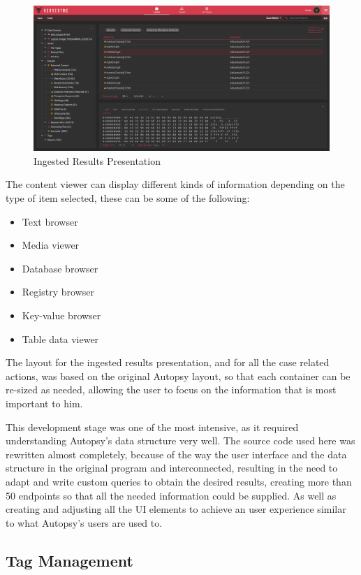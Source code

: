 \begin{figure}[ht]
 \centering
 \includegraphics[width=1\linewidth]{imgs/data.png}
 \caption{Ingested Results Presentation}
 \label{fig:data}
\end{figure}

The content viewer can display different kinds of information depending on the type of item selected, these can be some of the following:
\begin{itemize}
 \item Text browser
 \item Media viewer
 \item Database browser
 \item Registry browser
 \item Key-value browser
 \item Table data viewer
\end{itemize}

The layout for the ingested results presentation, and for all the case related actions, was based on the original Autopsy layout, so that each container can be re-sized as
needed, allowing the user to focus on the information that is most important to him.

This development stage was one of the most intensive, as it required understanding Autopsy's data structure very well. The source code used here was rewritten almost completely, 
because of the way the user interface and the data structure in the original program and interconnected, resulting in the need to adapt and write custom queries to obtain the desired results, creating more than 
50 endpoints so that all the needed information could be supplied. As well as creating and adjusting all the UI elements to achieve an user experience similar to what Autopsy's users are used to.

\subsection{Tag Management}

